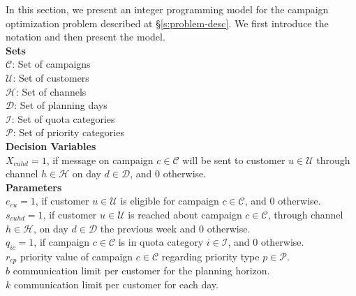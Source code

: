 \documentclass[11pt]{article}
\begin{document}
In this section, we present an integer programming model for the campaign optimization problem described at \S \ref{s:problem-desc}. We first introduce the notation and then present the model.\\

\noindent \textbf{Sets}\\

\noindent ${\mathcal{C}}$: Set of campaigns \\
\noindent ${\mathcal{U}}$: Set of customers \\
\noindent ${\mathcal{H}}$: Set of channels \\
\noindent ${\mathcal{D}}$: Set of planning days \\
\noindent ${\mathcal{I}}$: Set of quota categories \\
\noindent ${\mathcal{P}}$: Set of priority categories \\


\noindent \textbf{Decision Variables}\\

\noindent $X_{{c}{u}{h}{d}}=1$, if message on campaign $c \in \mathcal{C}$ will be sent to customer $u \in \mathcal{U}$ through channel $h \in \mathcal{H}$ on day $d \in \mathcal{D}$, and 0 otherwise.\\

\noindent \textbf{Parameters}\\

\noindent $e_{{c}{u}}=1$, if customer $u \in \mathcal{U}$ is eligible for campaign $c \in \mathcal{C}$, and 0 otherwise.\\

\noindent $s_{{c}{u}{h}{d}}=1$, if customer $u \in \mathcal{U}$ is reached about campaign $c \in \mathcal{C}$, through channel $h \in \mathcal{H}$, on day $d \in \mathcal{D}$ the previous week and 0 otherwise.\\

\noindent $q_{{i}{c}}=1$, if campaign $c \in \mathcal{C}$ is in quota category $i \in \mathcal{I}$, and 0 otherwise.\\

\noindent $r_{{c}{p}}$ priority value of campaign $c \in \mathcal{C}$ regarding priority type $p \in \mathcal{P}$.\\

\noindent $b$ communication limit per customer for the planning horizon.\\

\noindent $k$ communication limit per customer for each day.\\
\end{document}

